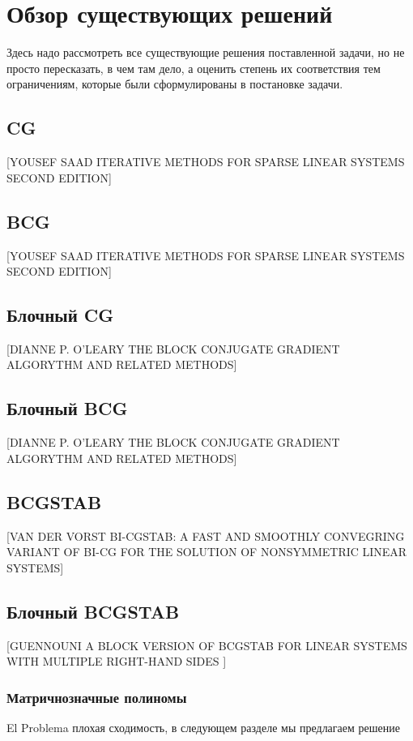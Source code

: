 \section{Обзор существующих решений}
\label{sec:Chapter2} 

Здесь надо рассмотреть все существующие решения поставленной задачи, но не
просто пересказать, в чем там дело, а оценить степень их соответствия тем
ограничениям, которые были сформулированы в постановке задачи.

\subsection{CG}
[YOUSEF SAAD ITERATIVE METHODS FOR SPARSE LINEAR SYSTEMS SECOND EDITION]
\subsection{BCG}
[YOUSEF SAAD ITERATIVE METHODS FOR SPARSE LINEAR SYSTEMS SECOND EDITION]

\subsection{Блочный CG}
[DIANNE P. O'LEARY THE BLOCK CONJUGATE GRADIENT ALGORYTHM AND RELATED METHODS]
\subsection{Блочный BCG}
[DIANNE P. O'LEARY THE BLOCK CONJUGATE GRADIENT ALGORYTHM AND RELATED METHODS]
\subsection{BCGSTAB}
[VAN DER VORST BI-CGSTAB: A FAST AND SMOOTHLY CONVEGRING VARIANT OF BI-CG FOR THE SOLUTION OF NONSYMMETRIC LINEAR SYSTEMS]
\subsection{Блочный BCGSTAB}
[GUENNOUNI A BLOCK VERSION OF BCGSTAB FOR LINEAR SYSTEMS WITH MULTIPLE RIGHT-HAND SIDES ]
\subsubsection{Матричнозначные полиномы}
El Problema плохая сходимость, в следующем разделе мы предлагаем решение


\newpage
